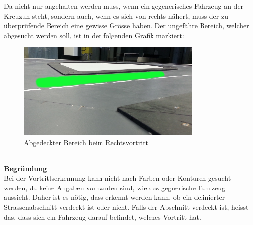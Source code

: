 \flushleft
Da nicht nur angehalten werden muss, wenn ein gegenerisches Fahrzeug an der Kreuzun steht, sondern auch, wenn es sich von rechts nähert, muss der zu überprüfende Bereich eine gewisse Grösse haben. Der ungefähre Bereich, welcher abgesucht werden soll, ist in der folgenden Grafik markiert:
\begin{figure}[H]%
\centering
\includegraphics[width=0.8\textwidth]{03_Loesungskonzept/pictures/rechtsvortritt_bereich.jpg}
\caption{Abgedeckter Bereich beim Rechtsvortritt}
\label{fig:bereichRechtsvortritt}
\end{figure}
\\
\flushleft
\textbf{Begründung}\\[0.2cm]
Bei der Vortrittserkennung kann nicht nach Farben oder Konturen gesucht werden, da keine Angaben vorhanden sind, wie das gegnerische Fahrzeug aussieht. Daher ist es nötig, dass erkennt werden kann, ob ein definierter Strassenabschnitt verdeckt ist oder nicht. Falls der Abschnitt verdeckt ist, heisst das, dass sich ein Fahrzeug darauf befindet, welches Vortritt hat.

